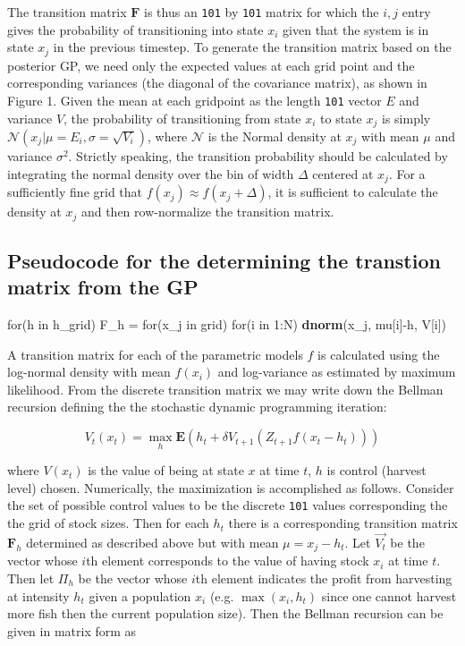 \documentclass[author-year, review]{elsarticle} %
\newenvironment{Shaded}{}{}
\newcommand{\KeywordTok}[1]{\textcolor[rgb]{0.00,0.44,0.13}{\textbf{{#1}}}}
\newcommand{\DecValTok}[1]{\textcolor[rgb]{0.25,0.63,0.44}{{#1}}}
\newcommand{\NormalTok}[1]{{#1}}
\begin{document}
The transition matrix $\mathbf{F}$ is thus an \texttt{101} by
\texttt{101} matrix for which the ${i,j}$ entry gives the probability of
transitioning into state $x_i$ given that the system is in state $x_j$
in the previous timestep. To generate the transition matrix based on the
posterior GP, we need only the expected values at each grid point and
the corresponding variances (the diagonal of the covariance matrix), as
shown in Figure 1. Given the mean at each gridpoint as the length
\texttt{101} vector $E$ and variance $V$, the probability of
transitioning from state $x_i$ to state $x_j$ is simply
$\mathcal{N}\left(x_j | \mu = E_i, \sigma = \sqrt{V_i}\right)$, where
$\mathcal{N}$ is the Normal density at $x_j$ with mean $\mu$ and
variance $\sigma^2$. Strictly speaking, the transition probability
should be calculated by integrating the normal density over the bin of
width $\Delta$ centered at $x_j$. For a sufficiently fine grid that
$f(x_j) \approx f(x_j + \Delta)$, it is sufficient to calculate the
density at $x_j$ and then row-normalize the transition matrix.

\subsection{Pseudocode for the determining the transtion matrix from the
GP}

\begin{Shaded}
\begin{Highlighting}[]
\NormalTok{for(h in h_grid)}
  \NormalTok{F_h = for(x_j in grid)}
          \NormalTok{for(i in }\DecValTok{1}\NormalTok{:N) }
            \KeywordTok{dnorm}\NormalTok{(x_j, mu[i]-h, V[i])}
\end{Highlighting}
\end{Shaded}

A transition matrix for each of the parametric models $f$ is calculated
using the log-normal density with mean $f(x_i)$ and log-variance as
estimated by maximum likelihood. From the discrete transition matrix we
may write down the Bellman recursion defining the the stochastic dynamic
programming iteration:

\begin{equation}
V_t(x_t) = \max_h \mathbf{E} \left( h_t + \delta V_{t+1}( Z_{t+1} f(x_t - h_t)) \right)
\end{equation}

where $V(x_t)$ is the value of being at state $x$ at time $t$, $h$ is
control (harvest level) chosen. Numerically, the maximization is
accomplished as follows. Consider the set of possible control values to
be the discrete \texttt{101} values corresponding the the grid of stock
sizes. Then for each $h_t$ there is a corresponding transition matrix
$\mathbf{F}_h$ determined as described above but with mean
$\mu = x_j - h_t$. Let $\vec{V_t}$ be the vector whose $i$th element
corresponds to the value of having stock $x_i$ at time $t$. Then let
$\Pi_h$ be the vector whose $i$th element indicates the profit from
harvesting at intensity $h_t$ given a population $x_i$ (e.g.
$\max(x_i, h_t)$ since one cannot harvest more fish then the current
population size). Then the Bellman recursion can be given in matrix form
as
\end{document}
